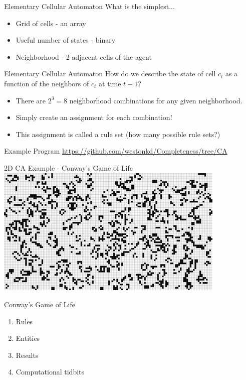 \documentclass[bigger]{beamer}
\begin{document}
\begin{frame}[label=sec-10]{Elementary Cellular Automaton}
What is the simplest...
\begin{itemize}
\item<1->Grid of cells - an array
\item<1->Useful number of states - binary
\item<1->Neighborhood - 2 adjacent cells of the agent
\end{itemize}
\end{frame}

\begin{frame}[label=sec-11]{Elementary Cellular Automaton}
How do we describe the state of cell \(c_t\) as a function of the neighbors of \(c_t\) at time \(t-1\)?
\begin{itemize}
\item<1->There are \(2^3 = 8\) neighborhood combinations for any given neighborhood.
\item<2->Simply create an assignment for each combination!
\item<3->This assignment is called a rule set (how many possible rule sets?)
\end{itemize}
\end{frame}

\begin{frame}[label=sec-12]{Example Program}
\url{https://github.com/westonkd/Completeness/tree/CA}
\end{frame}

\begin{frame}[label=sec-13]{2D CA Example - Conway's Game of Life}
\includegraphics[width=11cm]{images/gol1.jpg}
\end{frame}

\begin{frame}[label=sec-14]{Conway's Game of Life}
\begin{enumerate}
\item<1->Rules
\item<2->Entities
\item<3->Results
\item<4->Computational tidbits
\end{enumerate}
\end{frame}
\end{document}

